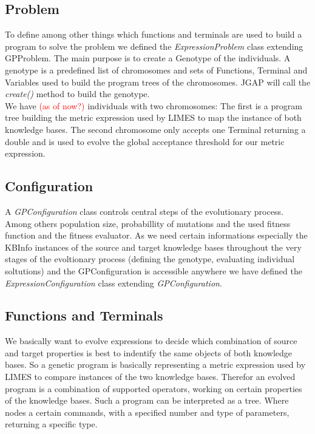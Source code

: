 \documentclass{article}%
\begin{document}
\subsection{Problem}
To define among other things which functions and terminals are used to build a program to solve the problem we defined the \textit{ExpressionProblem} class extending GPProblem. The main purpose is to create a Genotype of the individuals. A genotype is a predefined list of chromosomes and sets of Functions, Terminal and Variables used to build the program trees of the chromosomes. JGAP will call the \textit{create()} method to build the genotype.\\
We have \textcolor{red}{(as of now?)} individuals with two chromosomes: The first is a program tree building the metric expression used by LIMES to map the instance of both knowledge bases. The second chromosome only accepts one Terminal returning a double and is used to evolve the global acceptance threshold for our metric expression.

\subsection{Configuration}
A \textit{GPConfiguration} class controls central steps of the evolutionary process. Among others population size, probabillity of mutations and the used fitness function and the fitness evaluator.
As we need certain informations especially the KBInfo instances of the source and target knowledge bases throughout the very stages of the evoltionary process (defining the genotype, evaluating individual soltutions) and the GPConfiguration is accessible anywhere we have defined the \textit{ExpressionConfiguration} class extending \textit{GPConfiguration}.

\subsection{Functions and Terminals}
We basically want to evolve expressions to decide which combination of source and target properties is best to indentify the same objects of both knowledge bases. So a genetic program is basically representing a metric expression used by LIMES to compare instances of the two knowledge bases. Therefor an evolved program is a combination of supported operators, working on certain properties of the knowledge bases. Such a program can be interpreted as a tree. Where nodes a certain commands, with a specified number and type of parameters, returning a specific type.
\end{document}
